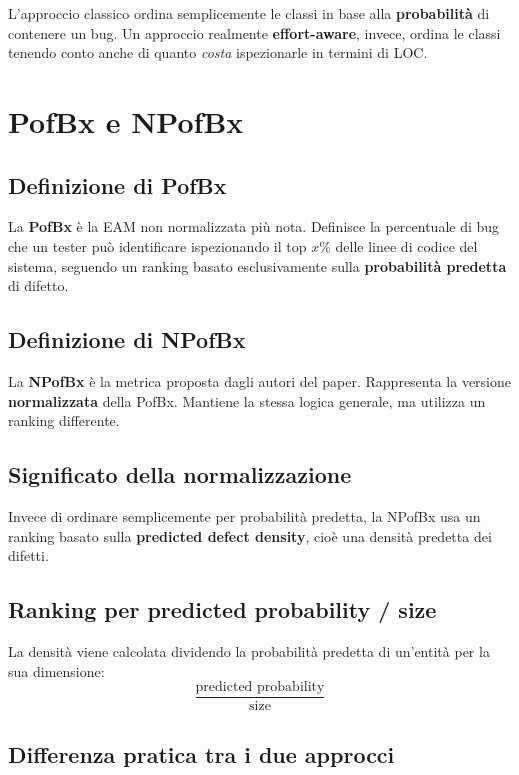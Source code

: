L'approccio classico ordina semplicemente le classi in base alla \textbf{probabilità} di contenere un bug. Un approccio realmente \textbf{effort-aware}, invece, ordina le classi tenendo conto anche di quanto \emph{costa} ispezionarle in termini di LOC.

\section{PofBx e NPofBx}

\subsection{Definizione di PofBx}

La \textbf{PofBx} è la EAM non normalizzata più nota. Definisce la percentuale di bug che un tester può identificare ispezionando il top \(x\%\) delle linee di codice del sistema, seguendo un ranking basato esclusivamente sulla \textbf{probabilità predetta} di difetto.

\subsection{Definizione di NPofBx}

La \textbf{NPofBx} è la metrica proposta dagli autori del paper. Rappresenta la versione \textbf{normalizzata} della PofBx. Mantiene la stessa logica generale, ma utilizza un ranking differente.

\subsection{Significato della normalizzazione}

Invece di ordinare semplicemente per probabilità predetta, la NPofBx usa un ranking basato sulla \textbf{predicted defect density}, cioè una densità predetta dei difetti.

\subsection{Ranking per predicted probability / size}

La densità viene calcolata dividendo la probabilità predetta di un'entità per la sua dimensione:
\[
\frac{\text{predicted probability}}{\text{size}}
\]

\subsection{Differenza pratica tra i due approcci}

